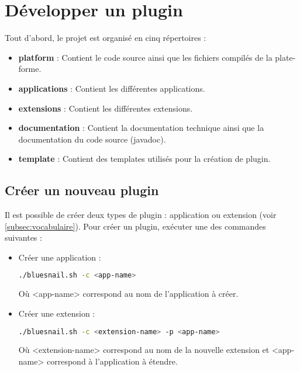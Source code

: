 \section{Développer un plugin}

    \noindent Tout d'abord, le projet est organisé en cinq répertoires :
    \begin{itemize}
        \item \textbf{platform} : Contient le code source ainsi que les fichiers compilés de la plate-forme.
        
        \item \textbf{applications} : Contient les différentes applications.
        
        \item \textbf{extensions} : Contient les différentes extensions.
        
        \item \textbf{documentation} : Contient la documentation technique ainsi que la documentation du code source (javadoc).
        
        \item \textbf{template} : Contient des templates utilisés pour la création de plugin.
    \end{itemize}

\subsection{Créer un nouveau plugin}
\label{subsec:creation_plugin}

    Il est possible de créer deux types de plugin : application ou extension (voir \ref{subsec:vocabulaire}). Pour créer un plugin, exécuter une des commandes suivantes :
    
    \begin{itemize}
        \item Créer une application :
        \begin{lstlisting}[language=bash]
        ./bluesnail.sh -c <app-name>
        \end{lstlisting}
        Où <app-name> correspond au nom de l'application à créer.
        
        \item Créer une extension :
        \begin{lstlisting}[language=bash]
        ./bluesnail.sh -c <extension-name> -p <app-name>
        \end{lstlisting}
        Où <extension-name> correspond au nom de la nouvelle extension et <app-name> correspond à l'application à étendre.
    \end{itemize}
    
